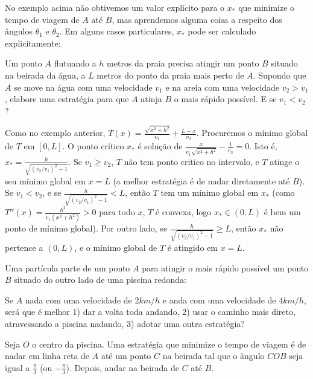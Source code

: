 No exemplo acima não obtivemos um valor explícito para o $x_*$ que minimize o
tempo de viagem de $A$ até $B$, mas aprendemos alguma coisa a respeito dos
ângulos $\theta_1$ e $\theta_2$. Em alguns casos particulares, $x_*$ pode
ser calculado explicitamente: 
\begin{exo}
Um ponto $A$ flutuando a $h$ metros da praia precisa atingir um ponto $B$
situado na beirada da água, a $L$ metros do ponto da praia mais perto de $A$.
Supondo que $A$ se move na água com uma velocidade $v_1$ e na areia com uma
velocidade $v_2>v_1$, elabore uma estratégia para que $A$ atinja $B$ o mais
rápido possível. E se $v_1<v_2$?
\begin{sol}
Como no exemplo anterior, $T(x)=\frac{\sqrt{x^2+h^2}}{v_1}+\frac{L-x}{v_2}$. 
Procuremos o mínimo global de $T$ em $[0,L]$.
O ponto crítico $x_*$ é solução de
$\frac{x}{v_1\sqrt{x^2+h^2}}-\frac{1}{v_2}=0$. Isto é,
$x_*=\frac{h}{\sqrt{(v_2/v_1)^2-1}}$. 
Se $v_1\geq v_2$, $T$ não tem ponto critico no intervalo, e  $T$ atinge o seu
mínimo global em $x=L$ (a melhor estratégia é de nadar diretamente até $B$). Se 
$v_1<v_2$, e se $\frac{h}{\sqrt{(v_2/v_1)^2-1}}<L$, então $T$ tem um mínimo
global em $x_*$ (como $T''(x)=\frac{h^2}{v_1(x^2+h^2)}>0$
para todo $x$, $T$ é convexa, logo $x_*\in (0,L)$ é bem um ponto de
mínimo global).
Por outro lado, se $\frac{h}{\sqrt{(v_2/v_1)^2-1}}\geq L$, então $x_*$ não
pertence a $(0,L)$, e o mínimo global de $T$ é atingido em $x=L$.
\end{sol} 
\end{exo}

\begin{exo}
Uma partícula parte de um ponto $A$ para 
atingir o mais rápido possível 
um ponto $B$ situado do outro lado de uma piscina redonda:
\begin{center}
\begin{bmlimage}\end{bmlimage}
\end{center}
Se $A$ nada com uma velocidade de $2km/h$ e anda
com uma velocidade de $4km/h$, será que é melhor 1) dar a volta toda
andando, 2) usar o caminho mais direto, atravessando a piscina
nadando, 3) adotar uma outra estratégia?
\begin{sol}
Seja $O$ o centro da piscina. Uma estratégia que minimize o tempo de
viagem é de nadar em linha
reta de $A$ até um ponto $C$ na beirada tal que o ângulo $COB$ seja igual a
$\frac{\pi}{3}$ (ou $-\frac{\pi}{3}$). Depois, andar na beirada de $C$
até $B$.
\end{sol}
\end{exo}

